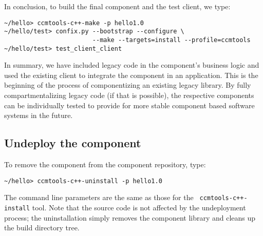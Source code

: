 In conclusion, to build the final component and the test client, we type:
\begin{small}
\begin{verbatim}
~/hello> ccmtools-c++-make -p hello1.0
~/hello/test> confix.py --bootstrap --configure \
                        --make --targets=install --profile=ccmtools
~/hello/test> test_client_client
\end{verbatim}
\end{small}

In summary, we have included legacy code in the component's business logic and
used the existing client to integrate the component in an application. This is
the beginning of the process of componentizing an existing legacy library. By
fully compartmentalizing legacy code (if that is possible), the respective
components can be individually tested to provide for more stable component based
software systems in the future.

\subsection{Undeploy the component}

To remove the component from the component repository, type:
\begin{small}
\begin{verbatim}
~/hello> ccmtools-c++-uninstall -p hello1.0
\end{verbatim}
\end{small}

The command line parameters are the same as those for the {\tt
ccmtools-c++-install} tool. Note that the source code is not affected by the
undeployment process; the uninstallation simply removes the component library
and cleans up the build directory tree.

